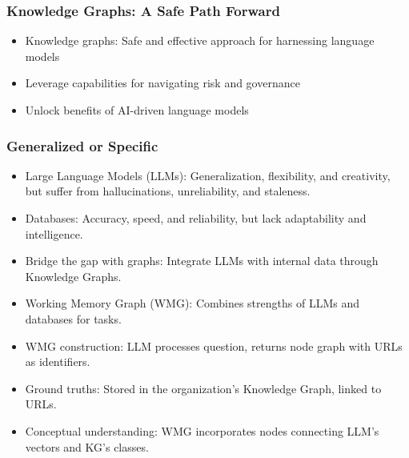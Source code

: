 \begin{frame}[fragile]\frametitle{Knowledge Graphs: A Safe Path Forward}
\begin{itemize}
\item Knowledge graphs: Safe and effective approach for harnessing language models
\item Leverage capabilities for navigating risk and governance
\item Unlock benefits of AI-driven language models
\end{itemize}
\end{frame}

\begin{frame}[fragile]\frametitle{Generalized or Specific}
\begin{itemize}
\item Large Language Models (LLMs): Generalization, flexibility, and creativity, but suffer from hallucinations, unreliability, and staleness.
\item Databases: Accuracy, speed, and reliability, but lack adaptability and intelligence.
\item Bridge the gap with graphs: Integrate LLMs with internal data through Knowledge Graphs.
\item Working Memory Graph (WMG): Combines strengths of LLMs and databases for tasks.
\item WMG construction: LLM processes question, returns node graph with URLs as identifiers.
\item Ground truths: Stored in the organization's Knowledge Graph, linked to URLs.
\item Conceptual understanding: WMG incorporates nodes connecting LLM's vectors and KG's classes.
\end{itemize}
\end{frame}


